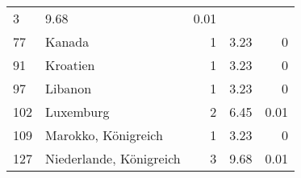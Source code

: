 \begin{longtable}{lXrrr}
       \num{3} &
       \num[round-mode=places,round-precision=2]{9,68} &
         \num[round-mode=places,round-precision=2]{0,01} \\

     77 &
     \multicolumn{1}{X}{ Kanada   } &


       \num{1} &
       \num[round-mode=places,round-precision=2]{3,23} &
         \num[round-mode=places,round-precision=2]{0} \\

     91 &
     \multicolumn{1}{X}{ Kroatien   } &


       \num{1} &
       \num[round-mode=places,round-precision=2]{3,23} &
         \num[round-mode=places,round-precision=2]{0} \\

     97 &
     \multicolumn{1}{X}{ Libanon   } &


       \num{1} &
       \num[round-mode=places,round-precision=2]{3,23} &
         \num[round-mode=places,round-precision=2]{0} \\

     102 &
     \multicolumn{1}{X}{ Luxemburg   } &


       \num{2} &
       \num[round-mode=places,round-precision=2]{6,45} &
         \num[round-mode=places,round-precision=2]{0,01} \\

     109 &
     \multicolumn{1}{X}{ Marokko, Königreich   } &


       \num{1} &
       \num[round-mode=places,round-precision=2]{3,23} &
         \num[round-mode=places,round-precision=2]{0} \\

     127 &
     \multicolumn{1}{X}{ Niederlande, Königreich   } &


       \num{3} &
       \num[round-mode=places,round-precision=2]{9,68} &
         \num[round-mode=places,round-precision=2]{0,01} \\


\end{longtable}
